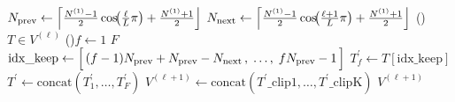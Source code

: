 \begin{algorithm}[b!]
\small
\renewcommand{\thealgocf}{B}
\DontPrintSemicolon
{}
\caption{\textsc{LP\_Comp}: suffix‑preserving layer‑wise video‑token compression}
\label{alg:lp_comp}


$N_{\text{prev}}\leftarrow\Bigl\lceil\frac{N^{(1)}-1}{2}\cos\!\bigl(\frac{\ell}{L}\pi\bigr)+\frac{N^{(1)}+1}{2}\Bigr\rfloor$\;
$N_{\text{next}}\leftarrow\Bigl\lceil\frac{N^{(1)}-1}{2}\cos\!\bigl(\frac{\ell+1}{L}\pi\bigr)+\frac{N^{(1)}+1}{2}\Bigr\rfloor$
\vspace{-8pt}
\ForEach(){$T\in V^{(\ell)}$}{
  \ForEach(){$f\leftarrow1$ \KwTo $F$}{
    $\mathrm{idx\_keep}\leftarrow\Bigl[\,(f-1)N_{\text{prev}}+N_{\text{prev}}-N_{\text{next}}\,,\;\dots,\;fN_{\text{prev}}-1\,\Bigr]$\;
    $T_f^{\prime}\leftarrow T[\mathrm{idx\_keep}]$
  }
  $T^{\prime}\leftarrow\mathrm{concat}(T_1^{\prime},\dots,T_F^{\prime})$\;
}
$V^{(\ell+1)}\leftarrow\mathrm{concat}(T^{\prime}\_\text{clip1},\dots,T^{\prime}\_\text{clipK})$\;
\Return $V^{(\ell+1)}$
\end{algorithm}


